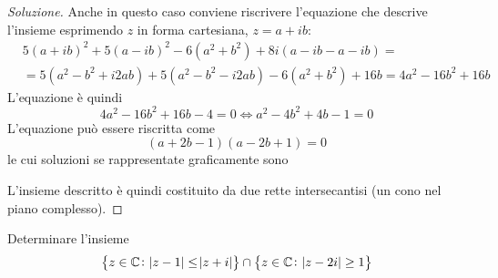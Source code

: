 \begin{proof}[Soluzione]
    Anche in questo caso conviene riscrivere l'equazione che descrive l'insieme esprimendo $z$ in forma cartesiana, $z=a+ib$:
    \[
    \begin{split}
    &5(a+ib)^2+5(a-ib)^2-6(a^2+b^2)+8i(a-ib-a-ib )= \\
    & = 5(a^2-b^2+i2ab)+5(a^2-b^2-i2ab)-6(a^2+b^2)+16b = 4a^2 -16b^2 +16 b 
    \end{split}
    \]
    L'equazione è quindi
    \[
    4a^2-16b^2+16b -4 = 0 \iff a^2-4b^2+4b-1 = 0
    \]
    L'equazione può essere riscritta come 
    \[
    (a+2b-1)(a-2b+1)=0
    \]
    le cui soluzioni se rappresentate graficamente sono
    \begin{center}
    \end{center}
    L'insieme descritto è quindi costituito da due rette intersecantisi (un cono nel piano complesso).
\end{proof}
\begin{exercise}
    \label{ex:3.6}
    Determinare l'insieme
    \[
    \left\{z\in\amsbb{C}\colon \abs{z-1}\le \abs{z+i}\right\}\cap\left\{ z\in\amsbb{C}\colon \abs{z-2i}\ge 1\right\}
    \]
\end{exercise}
